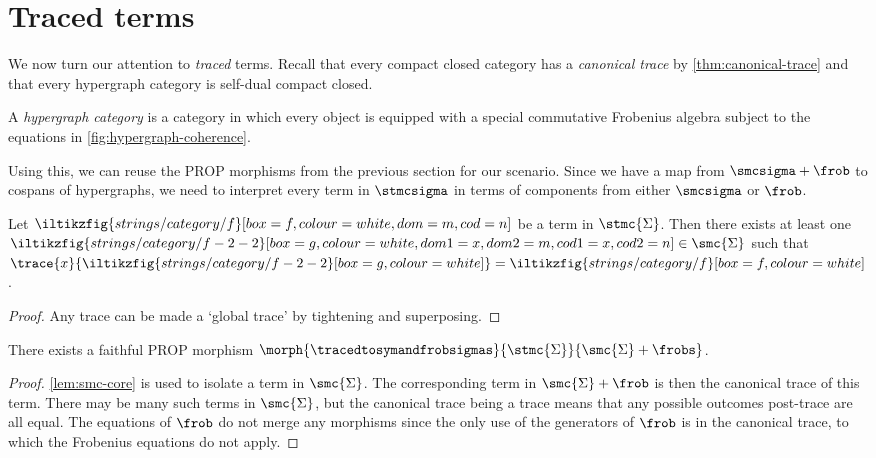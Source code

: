 \section{Traced terms}

We now turn our attention to \emph{traced} terms.
Recall that every compact closed category has a \emph{canonical trace} by
\cref{thm:canonical-trace}
and that every hypergraph category is self-dual
compact closed.

\begin{definition}
    \label{def:hypergraph-category}
    A \emph{hypergraph category} is a category in which every object is equipped
    with a special commutative Frobenius algebra subject to the equations in
    \cref{fig:hypergraph-coherence}.
\end{definition}




Using this, we can reuse the PROP morphisms from the previous section for our
scenario.
Since we have a map from \(\smcsigma + \frob\) to cospans of hypergraphs, we
need to interpret every term in \(\stmcsigma\) in terms of components from
either \(\smcsigma\) or \(\frob\).

\begin{lemma}\label{lem:smc-core}
    Let \(\iltikzfig{strings/category/f}[box=f,colour=white,dom=m,cod=n]\) be a
    term in \(\stmc{\Sigma}\).
    Then there exists at least one \(
        \iltikzfig{strings/category/f-2-2}[box=g,colour=white,dom1=x,dom2=m,cod1=x,cod2=n]
        \in \smc{\Sigma}
    \) such that \(
        \trace{x}{\iltikzfig{strings/category/f-2-2}[box=g, colour=white]}
        =
        \iltikzfig{strings/category/f}[box=f,colour=white]
    \).
\end{lemma}
\begin{proof}
    Any trace can be made a `global trace' by tightening and superposing.
\end{proof}

\begin{proposition}
    There exists a faithful PROP morphism \(
        \morph{\tracedtosymandfrobsigmas}{\stmc{\Sigma}}{\smc{\Sigma} + \frobs}
    \).
\end{proposition}
\begin{proof}
    \cref{lem:smc-core} is used to isolate a term in \(\smc{\Sigma}\).
    The corresponding term in \(\smc{\Sigma} + \frob\) is then the canonical
    trace of this term.
    There may be many such terms in \(\smc{\Sigma}\), but the canonical trace
    being a trace means that any possible outcomes post-trace are all equal.
    The equations of \(\frob\) do not merge any morphisms
    since the only use of the generators of \(\frob\) is in the canonical trace,
    to which the Frobenius equations do not apply.
\end{proof}

